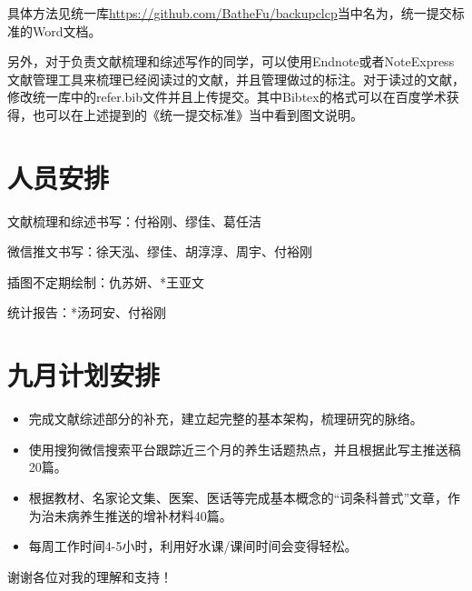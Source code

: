 \documentclass{article}
\begin{document}
具体方法见统一库\url{https://github.com/BatheFu/backupclcp}当中名为，统一提交标准的Word文档。
    
    另外，对于负责文献梳理和综述写作的同学，可以使用Endnote或者NoteExpress文献管理工具来梳理已经阅读过的文献，并且管理做过的标注。对于读过的文献，修改统一库中的refer.bib文件并且上传提交。其中Bibtex的格式可以在百度学术获得，也可以在上述提到的《统一提交标准》当中看到图文说明。
    \section{人员安排}
    文献梳理和综述书写：付裕刚、缪佳、葛任洁
    
    微信推文书写：徐天泓、缪佳、胡淳淳、周宇、付裕刚
    
    插图不定期绘制：仇苏妍、*王亚文
    
    统计报告：*汤珂安、付裕刚
    
    \section{九月计划安排}
    \begin{itemize}
        \item 完成文献综述部分的补充，建立起完整的基本架构，梳理研究的脉络。
        \item 使用搜狗微信搜索平台跟踪近三个月的养生话题热点，并且根据此写主推送稿20篇。
        \item 根据教材、名家论文集、医案、医话等完成基本概念的“词条科普式”文章，作为治未病养生推送的增补材料40篇。
        \item 每周工作时间4-5小时，利用好水课/课间时间会变得轻松。
    \end{itemize}

谢谢各位对我的理解和支持！
\end{document}
